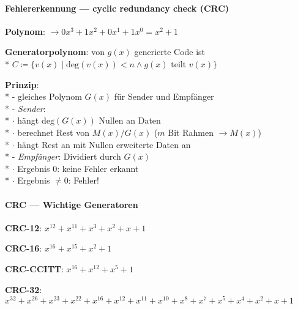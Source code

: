 \paragraph{Fehlererkennung --- cyclic redundancy check (CRC)}
\begin{items}
  \item \textbf{Polynom}:  \( \to 0x^3+1x^2+0x^1+1x^0 = x^2+1 \)
  \item \textbf{Generatorpolynom}: von \( g(x) \) generierte Code ist \\*
    \( C \coloneqq \{ v(x) \mid \text{deg}(v(x)) < n \wedge g(x) \text{ teilt } v(x) \} \)
  \item \textbf{Prinzip}: \\*
    - gleiches Polynom \( G(x) \) für Sender und Empfänger \\*
    - \emph{Sender}: \\*
    \phantom{-} \( \cdot \) hängt \( \text{deg}(G(x)) \) Nullen an Daten \\*
    \phantom{-} \( \cdot \) berechnet Rest von \( M(x)/G(x) \) (\( m \) Bit Rahmen \( \to M(x) \)) \\*
    \phantom{-} \( \cdot \) hängt Rest an mit Nullen erweiterte Daten an \\*
    - \emph{Empfänger}: Dividiert durch \( G(x) \) \\*
      \phantom{-} \( \cdot \) Ergebnis \( 0 \): keine Fehler erkannt \\*
      \phantom{-} \( \cdot \) Ergebnis \( \neq 0 \): Fehler!
\end{items}

\paragraph{CRC --- Wichtige Generatoren}
\begin{items}
  \item \textbf{CRC-12}: \( x^{12}+x^{11}+x^3+x^2+x+1 \)
  \item \textbf{CRC-16}: \( x^{16}+x^{15}+x^2+1 \)
  \item \textbf{CRC-CCITT}: \( x^{16}+x^{12}+x^5+1 \)
  \item \textbf{CRC-32}: \( x^{32}+x^{26}+x^{23}+x^{22}+x^{16}+x^{12}+x^{11}+x^{10}+x^8+x^7+x^5+x^4+x^2+x+1 \) 
\end{items}

